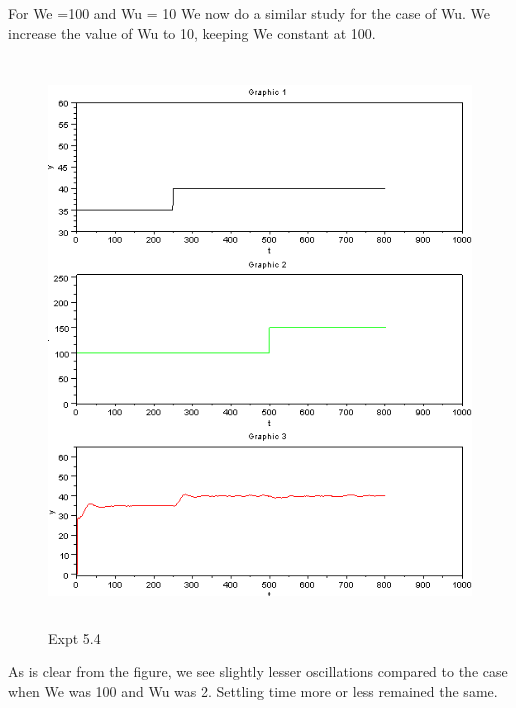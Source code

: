 For We =100 and Wu = 10
We now do a similar study for the case of Wu. We increase the value of Wu to 10, keeping We constant at 100.
\begin{figure}[H]
  \includegraphics[width=12cm, height=15cm]{mpc/5_4.PNG}
  \caption{Expt 5.4}
\end{figure}
As is clear from the figure, we see slightly lesser oscillations compared to the case when We was 100 and Wu was 2. Settling time more or less remained the same.
